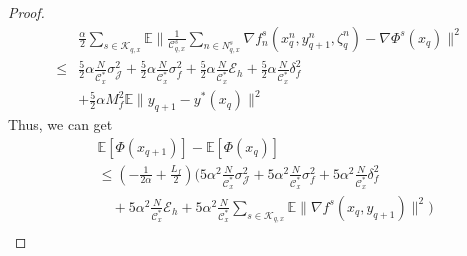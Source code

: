\documentclass[lettersize,journal]{IEEEtran}
\begin{document}
\begin{proof}
\begin{align*}
    &\frac{\alpha}{2}\sum_{s\in \mathcal{K}_{q,x}}\mathbb{E}\|\frac{1}{\mathcal{C}^{s}_{q,x}}\sum_{n\in N^{s}_{q,x}}\nabla f^s_n(x_{q}^n,y_{q+1}^n,\zeta_q^n)-\nabla \Phi^s(x_{q})\|^2\\
    \leq &\frac{5}{2}\alpha \frac{N}{\mathcal{C}_x^*}\sigma_{\mathcal{J}}^2+\frac{5}{2}\alpha \frac{N}{\mathcal{C}_x^*}\sigma_f^2+\frac{5}{2}\alpha\frac{N}{\mathcal{C}_x^*}\mathcal{E}_h+\frac{5}{2}\alpha\frac{N}{\mathcal{C}_x^*}\delta^2_f\\&+\frac{5}{2}\alpha M_f^2 \mathbb{E}\|y_{q+1}-y^*(x_q)\|^2
\end{align*}
Thus, we can get
\begin{align*}
&\mathbb{E}\left[\Phi(x_{q+1})\right]-\mathbb{E}\left[\Phi(x_q)\right]\\
&\leq(-\frac{1}{2\alpha}+\frac{ L_f}{2})(5\alpha^2\frac{N}{\mathcal{C}_x^*}\sigma_{\mathcal{J}}^2+5\alpha^2\frac{N}{\mathcal{C}_x^*}\sigma_f^2+5\alpha^2\frac{N}{\mathcal{C}_x^*}\delta^2_f\\&\quad+5\alpha^2\frac{N}{\mathcal{C}_x^*}\mathcal{E}_h+5\alpha^2\frac{N}{\mathcal{C}_x^*}\sum_{s\in \mathcal{K}_{q,x}}\mathbb{E}\|\nabla f^s(x_{q},y_{q+1})\|^2)\\

\end{align*}
\end{proof}
\end{document}
